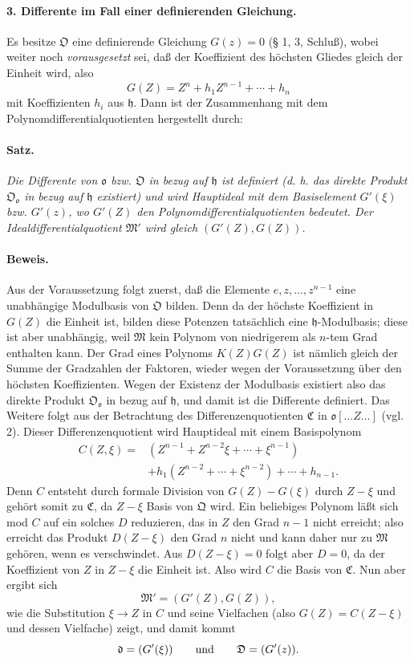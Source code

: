 \paragraph{3. Differente im Fall einer definierenden Gleichung.}
Es besitze $\mathfrak O$ eine definierende Gleichung $G(z)=0$ (§ 1, 3, Schluß), wobei weiter noch \emph{vorausgesetzt} sei, daß der Koeffizient des höchsten Gliedes gleich der Einheit wird, also
\[
G(Z)=Z^n+h_1Z^{n-1}+\cdots+h_n
\]
mit Koeffizienten $h_i$ aus $\mathfrak h$. Dann ist der Zusammenhang mit dem Polynomdifferentialquotienten hergestellt durch:

\paragraph{Satz.}
\emph{Die Differente von $\mathfrak o$ bzw. $\mathfrak O$ in bezug auf $\mathfrak h$ ist definiert (d. h. das direkte Produkt $\mathfrak O_{\mathfrak o}$ in bezug auf $\mathfrak h$ existiert) und wird Hauptideal mit dem Basiselement $G'(\xi)$ bzw. $G'(z)$, wo $G'(Z)$ den Polynomdifferentialquotienten bedeutet. Der Idealdifferentialquotient $\mathfrak M'$ wird gleich $(G'(Z),G(Z))$.}

\paragraph{Beweis.}
Aus der Voraussetzung folgt zuerst, daß die Elemente $e,z,\ldots,z^{n-1}$ eine unabhängige Modulbasis von $\mathfrak O$ bilden. Denn da der höchste Koeffizient in $G(Z)$ die Einheit ist, bilden diese Potenzen tatsächlich eine $\mathfrak h$-Modulbasis; diese ist aber unabhängig, weil $\mathfrak M$ kein Polynom von niedrigerem als $n$-tem Grad enthalten kann. Der Grad eines Polynoms $K(Z)G(Z)$ ist nämlich gleich der Summe der Gradzahlen der Faktoren, wieder wegen der Voraussetzung über den höchsten Koeffizienten. Wegen der Existenz der Modulbasis existiert also das direkte Produkt $\mathfrak O_{\mathfrak o}$ in bezug auf $\mathfrak h$, und damit ist die Differente definiert. Das Weitere folgt aus der Betrachtung des Differenzenquotienten $\mathfrak C$ in $\mathfrak o[\ldots Z\ldots]$ (vgl. 2). Dieser Differenzenquotient wird Hauptideal mit einem Basispolynom
\[
\begin{aligned}
C(Z,\xi)={}&(Z^{n-1}+Z^{n-2}\xi+\cdots+\xi^{n-1})\\
&+h_1(Z^{n-2}+\cdots+\xi^{n-2})+\cdots+h_{n-1}.
\end{aligned}
\]
Denn $C$ entsteht durch formale Division von $G(Z)-G(\xi)$ durch $Z-\xi$ und gehört somit zu $\mathfrak C$, da $Z-\xi$ Basis von $\mathfrak Q$ wird. Ein beliebiges Polynom läßt sich mod $C$ auf ein solches $D$ reduzieren, das in $Z$ den Grad $n-1$ nicht erreicht; also erreicht das Produkt $D(Z-\xi)$ den Grad $n$ nicht und kann daher nur zu $\mathfrak M$ gehören, wenn es verschwindet. Aus $D(Z-\xi)=0$ folgt aber $D=0$, da der Koeffizient von $Z$ in $Z-\xi$ die Einheit ist. Also wird $C$ die Basis von $\mathfrak C$. Nun aber ergibt sich
\[
\mathfrak M'=(G'(Z),G(Z)),
\]
wie die Substitution $\xi\to Z$ in $C$ und seine Vielfachen (also $G(Z)=C(Z-\xi)$ und dessen Vielfache) zeigt, und damit kommt
\[
\mathfrak d=(G'(\xi))
\qquad\hbox{und}\qquad
\mathfrak D=(G'(z)).
\]
